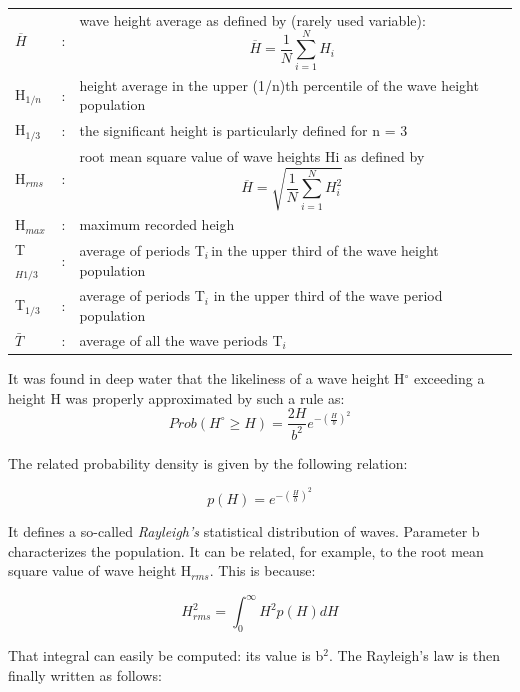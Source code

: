 \begin{tabular}{p{0.8in}p{0.1in}p{3.5in}}
  $\overline{H}$ & : & wave height average as defined by (rarely used variable):\newline
                       $$\overline{H} = \frac{1}{N}\sum_{i=1}^{N}H_{i}$$\\
H${}_{1/n}$ & : & height average in the upper (1/n)th percentile of the wave height population \\
H${}_{1/3}$ & : & the significant height is particularly defined for n = 3 \\
H${}_{rms}$ & : & root mean square value of wave heights Hi as defined by\newline
                       $$\overline{H} = \sqrt{\frac{1}{N}\sum_{i=1}^{N}H_{i}^{2}}$$\\
H${}_{max}$ & :  & maximum recorded heigh \\
T${}_{H1/3}$ & : & average of periods T${}_{i\ }$in the upper third of the wave height population\newline  \\
T${}_{1/3}$ & : & average of periods T${}_{i}$ in the upper third of the wave period population \\
  $\bar{T}$ & : & average of all the wave periods T${}_{i}$ \\
\end{tabular}

It was found in deep water that the likeliness of a wave height
H$\mathrm{{}^\circ}$ exceeding a height H was properly approximated by such a
rule as:
\begin{equation}
  Prob(H^{\circ} \ge H) = \frac{2H}{b^{2}}e^{-\left(\frac{H}{b}\right)^{2}}
\end{equation}

The related probability density is given by the following relation:

\begin{equation}
  p(H) = e^{-\left(\frac{H}{b}\right)^{2}}
\end{equation}

It defines a so-called \textit{Rayleigh's} statistical distribution of waves.
Parameter b characterizes the population. It can be related, for example, to
the root mean square value of wave height H${}_{rms}$. This is because:

\begin{equation}
  H_{rms}^{2} = \int_{0}^{\infty}H^{2}p(H)dH
\end{equation}

That integral can easily be computed: its value is b${}^{2}$. The Rayleigh's
law is then finally written as follows:

